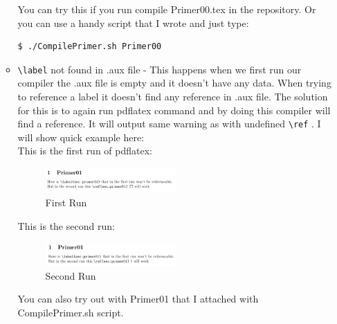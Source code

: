 \documentclass[a4paper,oneside,8pt]{extarticle}
\begin{document}
\begin{enumerate}
\begin{itemize}
                You can try this if you run compile Primer00.tex in the repository. Or you can use a handy script that I wrote and just type:
                \begin{lstlisting}[language=bash]
                    $ ./CompilePrimer.sh Primer00
                \end{lstlisting}
            
            \item \verb|\label| not found in .aux file - This happens when we first run our compiler the .aux file is empty and it doesn't have any data. When trying to reference a label it doesn't find any reference in .aux file. The solution for this is to again run pdflatex command and by doing this compiler will find a reference. It will output same warning as with undefined \verb|\ref| . I will show quick example here:\\
                  This is the first run of pdflatex:\\
                  \begin{figure}[h]
                    \centering
                    \includegraphics[width=0.5\textwidth]{FirstRun.png}
                    \caption{First Run}
                    \label{fig:FirstRun}
                \end{figure}
                
                  This is the second run:\\
                  \begin{figure}[h]
                    \centering
                    \includegraphics[width=0.5\textwidth]{SecondRun.png}
                    \caption{Second Run}
                    \label{fig:SecondRun}
                  \end{figure}

                  You can also try out with Primer01 that I attached with CompilePrimer.sh script.



\end{itemize}
\end{enumerate}
\end{document}
